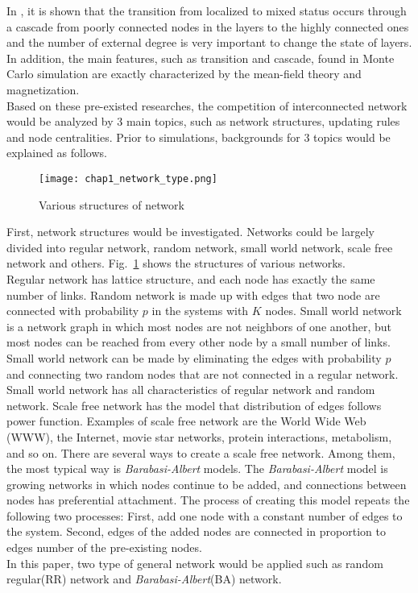 In \parencite{gomez2015}, it is shown that the transition from localized to mixed status occurs through a cascade from poorly connected nodes in the layers to the highly connected ones and the number of external degree is very important to change the state of layers. In addition, the main features, such as transition and cascade, found in Monte Carlo simulation are exactly characterized by the mean-field theory and magnetization\parencite{alvarez2016, diep2017, amato2017, gomez2015}. \\
Based on these pre-existed researches, the competition of interconnected network would be analyzed by 3 main topics, such as network structures, updating rules and node centralities. Prior to simulations, backgrounds for 3 topics would be explained as follows. 
\begin{figure}[!htb]
	\centering
	\texttt{[image: chap1\_network\_type.png]}
	\caption{Various structures of network}
	\label{chap1_network_type}
\end{figure}
First, network structures would be investigated. Networks could be largely divided into regular network, random network\parencite{erdos1960}, small world network\parencite{watts1998}, scale free network\parencite{barabasi1999} and others. Fig.~\ref{chap1_network_type} shows the structures of various networks. \\
Regular network has lattice structure, and  each node has exactly the same number of links. Random network is made up with edges that two node are connected with probability $p$ in the systems with $K$ nodes. Small world network is a network graph in which most nodes are not neighbors of one another, but most nodes can be reached from every other node by a small number of links. Small world network can be made by eliminating the edges with probability $p$ and connecting two random nodes that are not connected in a regular network. Small world network has all characteristics of regular network and random network.
Scale free network has the model that distribution of edges follows power function. Examples of scale free network are the World Wide Web (WWW), the Internet, movie star networks, protein interactions, metabolism, and so on.
There are several ways to create a scale free network. Among them, the most typical way is \textit{Barabasi-Albert} models.
The \textit{Barabasi-Albert} model is growing networks in which nodes continue to be added, and connections between nodes has preferential attachment. The process of creating this model repeats the following two processes: First, add one node with a constant number of edges to the system. Second, edges of the added nodes are connected in proportion to edges number of the pre-existing nodes.\\
In this paper, two type of general network would be applied such as random regular(RR) network and \textit{Barabasi-Albert}(BA) network. \\

